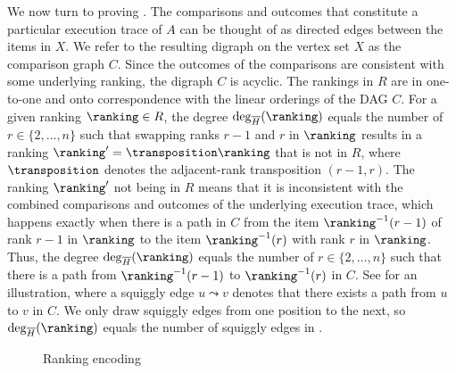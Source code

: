 \documentclass{toc}
\begin{document}
We now turn to proving . The comparisons and outcomes that constitute a particular execution trace of $A$ can be thought of as directed edges between the items in $X$. We refer to the resulting digraph on the vertex set $X$ as the comparison graph $C$. Since the outcomes of the comparisons are consistent with some underlying ranking, the digraph $C$ is acyclic. The rankings in $R$ are in one-to-one and onto correspondence with the linear orderings of the DAG $C$. For a given ranking $\ranking \in R$, the degree $\deg_{\overline{H}}(\ranking)$ equals the number of $r \in \{2,\dots,n\}$ such that swapping ranks $r-1$ and $r$ in $\ranking$ results in a ranking $\ranking' = \transposition \ranking$ that is not in $R$, where $\transposition$ denotes the adjacent-rank transposition $(r-1,r)$. The ranking $\ranking'$ not being in $R$ means that it is inconsistent with the combined comparisons and outcomes of the underlying execution trace, which happens exactly when there is a path in $C$ from the item $\ranking^{-1}(r-1)$ of rank $r-1$ in $\ranking$ to the item $\ranking^{-1}(r)$ with rank $r$ in $\ranking$. Thus, the degree $\deg_{\overline{H}}(\ranking)$ equals the number of $r \in \{2,\dots,n\}$ such that there is a path from $\ranking^{-1}(r-1)$ to $\ranking^{-1}(r)$ in $C$. See  for an illustration, where a squiggly edge $u \leadsto v$ denotes that there exists a path from $u$ to $v$ in $C$. We only draw squiggly edges from one position to the next, so $\deg_{\overline{H}}(\ranking)$ equals the number of squiggly edges in . 

\begin{figure}[ht]
    \centering
\caption{Ranking encoding}\label{fig:encoding}
\end{figure}
\end{document}
